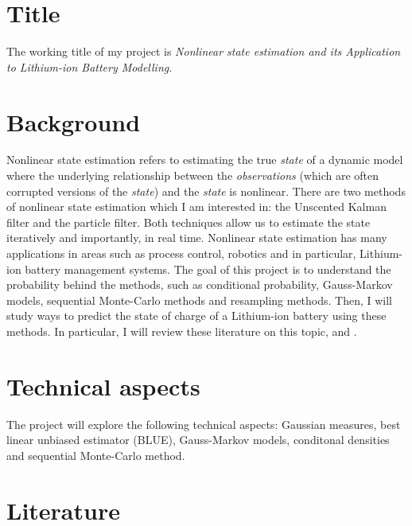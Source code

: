 \documentclass[]{STAT_547C}
\begin{document}
\vspace{-2cm}


\section{Title}

The working title of my project is \emph{Nonlinear state estimation and its Application to Lithium-ion Battery Modelling}.  

\section{Background}

Nonlinear state estimation refers to estimating the true \textit{state} of a dynamic model where the underlying relationship between the \textit{observations} (which are often corrupted versions of the \textit{state}) and the \textit{state} is nonlinear. There are two methods of nonlinear state estimation which I am interested in: the Unscented Kalman filter and the particle filter. Both techniques allow us to estimate the state iteratively and importantly, in real time. Nonlinear state estimation has many applications in areas such as process control, robotics and in particular, Lithium-ion battery management systems. The goal of this project is to understand the probability behind the methods, such as conditional probability, Gauss-Markov models, sequential Monte-Carlo methods and resampling methods. Then, I will study ways to predict the state of charge of a Lithium-ion battery using these methods. In particular, I will review these literature on this topic, \cite{Tulsyan:2016} and \cite{Sun:2011}.
\section{Technical aspects}

The project will explore the following technical aspects: Gaussian measures, best linear unbiased estimator (BLUE), Gauss-Markov models, conditonal densities and sequential Monte-Carlo method.

\section{Literature}
\end{document}
